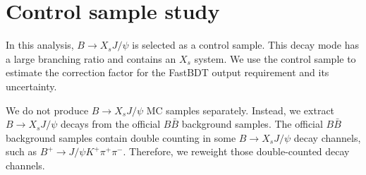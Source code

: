 \chapter{Control sample study}
\label{chap:control_sample}
In this analysis, $B\rightarrow X_{s} J/\psi$ is selected as a control sample.
This decay mode has a large branching ratio and contains an $X_{s}$ system.
We use the control sample to estimate the correction factor for the FastBDT output requirement and its uncertainty.

We do not produce $B\rightarrow X_{s} J/\psi$ MC samples separately.
Instead, we extract $B\rightarrow X_{s} J/\psi$ decays from the official $B\bar{B}$ background samples.
The official $B\bar{B}$ background samples contain double counting in some $B\rightarrow X_{s} J/\psi$ decay channels, such as $B^{+} \rightarrow J/\psi K^{+} \pi^{+} \pi^{-}$.
Therefore, we reweight those double-counted decay channels.

